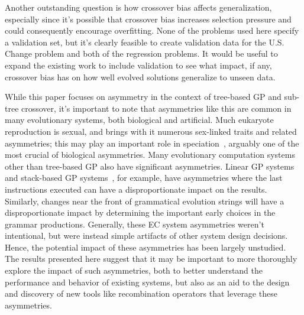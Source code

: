 \documentclass{sig-alternate}
\begin{document}
Another outstanding question is how crossover bias affects generalization, especially since it's possible that crossover
bias increases selection pressure and could consequently encourage overfitting. None of the problems used here specify
a validation set, but it's clearly feasible to create validation data for the U.S. Change problem and both of the
regression problems. It would be useful to expand the existing work to include validation to see what impact, if any,
crossover bias has on how well evolved solutions generalize to unseen data.

While this paper focuses on asymmetry in the context of tree-based GP and sub-tree crossover, it's important to note
that asymmetries like this are common in many evolutionary systems, both biological and artificial. Much eukaryote
reproduction is sexual, and brings with it numerous sex-linked traits and related asymmetries; this may play an
important role in speciation~\cite{qvarnstrom2009speciation}, arguably one of the most crucial of biological
asymmetries. Many evolutionary computation systems other than tree-based GP also have significant asymmetries. Linear
GP systems~\cite{brameier2007linear} and stack-based GP systems~\cite{spector:2002:GPEM}, for example, have asymmetries
where the last instructions executed can have a disproportionate impact on the results. Similarly, changes near the
front of grammatical evolution \cite{o2003grammatical} strings will have a disproportionate impact by determining the
important early choices in the grammar productions. Generally, these EC system asymmetries weren't intentional, but
were instead simple artifacts of other system design decisions. Hence, the potential impact of these asymmetries has
been largely unstudied. The results presented here suggest that it may be important to more thoroughly explore the
impact of such asymmetries, both to better understand the performance and behavior of existing systems, but also as an
aid to the design and discovery of new tools like recombination operators that leverage these asymmetries.





\end{document}
